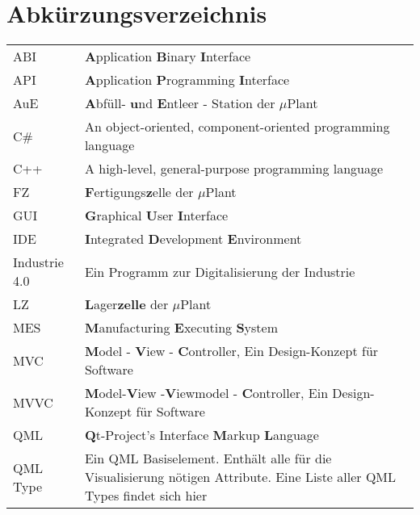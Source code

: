 \chapter*{Abkürzungsverzeichnis}

\begin{center}
	
	\renewcommand{\arraystretch}{1.1}
	\begin{supertabular}{p{2.1cm}p{10.9cm}}
		ABI       & \textbf{A}pplication \textbf{B}inary \textbf{I}nterface \\
		API	      & \textbf{A}pplication \textbf{P}rogramming \textbf{I}nterface \\
		AuE       & \textbf{A}bfüll- \textbf{u}nd \textbf{E}ntleer - Station der $\mu$Plant \\
		C\#       & An object-oriented, component-oriented programming language \\
		C++       & A high-level, general-purpose programming language \\
		FZ        & \textbf{F}ertigungs\textbf{z}elle der $\mu$Plant \\
		GUI       & \textbf{G}raphical \textbf{U}ser \textbf{I}nterface \\
		IDE		  & \textbf{I}ntegrated \textbf{D}evelopment \textbf{E}nvironment \\
		Industrie 4.0 & Ein Programm zur Digitalisierung der Industrie \\
		LZ        & \textbf{L}ager\textbf{zelle} der $\mu$Plant \\
		MES       & \textbf{M}anufacturing \textbf{E}xecuting \textbf{S}ystem \\
		MVC       & \textbf{M}odel - \textbf{V}iew - \textbf{C}ontroller, Ein Design-Konzept für Software \\
		MVVC      & \textbf{M}odel-\textbf{V}iew -\textbf{V}iewmodel - \textbf{C}ontroller, Ein Design-Konzept für Software \\
		QML       & \textbf{Q}t-Project's Interface \textbf{M}arkup \textbf{L}anguage \\
		QML Type  & Ein QML Basiselement. Enthält alle für die Visualisierung nötigen Attribute. Eine Liste aller QML Types findet sich hier \cite{qmlTypeList} \\

\end{supertabular}
\end{center}
